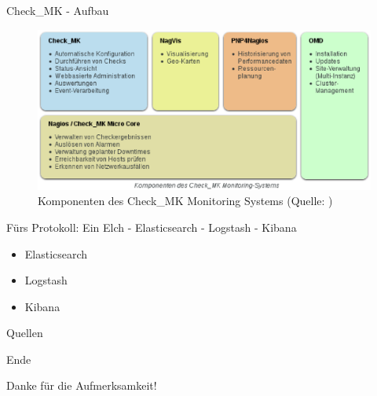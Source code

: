 \documentclass[12pt]{beamer}
\begin{document}
\begin{frame}{Check\_MK - Aufbau}
	\begin{figure}
		\centering
		\includegraphics[width=1\textwidth]{pics/checkMKAufbau.eps}
		\caption[Komponenten des Check\_MK Monitoring Systems]{Komponenten des Check\_MK Monitoring Systems (Quelle: \textcite{checkmkmonitoringpic})}
	\end{figure}
\end{frame}
\begin{frame}{Fürs Protokoll: Ein Elch - Elasticsearch - Logstash - Kibana}
\begin{itemize}
	\item Elasticsearch
	\item Logstash
	\item Kibana
\end{itemize}
\end{frame}
\begin{frame}{Quellen}
	\printbibliography
\end{frame}
\begin{frame}{Ende}
	\begin{center}
	Danke für die Aufmerksamkeit!
	\end{center}
	
\end{frame}
\end{document}
